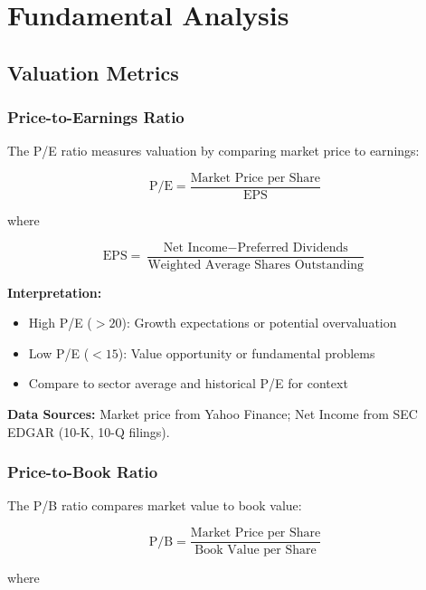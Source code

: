 \documentclass[11pt,a4paper]{article}
\begin{document}
\section{Fundamental Analysis}

\subsection{Valuation Metrics}

\subsubsection{Price-to-Earnings Ratio}

The P/E ratio measures valuation by comparing market price to earnings:

\begin{equation}
\text{P/E} = \frac{\text{Market Price per Share}}{\text{EPS}}
\end{equation}

where

\begin{equation}
\text{EPS} = \frac{\text{Net Income} - \text{Preferred Dividends}}{\text{Weighted Average Shares Outstanding}}
\end{equation}

\textbf{Interpretation:}
\begin{itemize}
    \item High P/E ($>20$): Growth expectations or potential overvaluation
    \item Low P/E ($<15$): Value opportunity or fundamental problems
    \item Compare to sector average and historical P/E for context
\end{itemize}

\textbf{Data Sources:} Market price from Yahoo Finance; Net Income from SEC EDGAR (10-K, 10-Q filings).

\subsubsection{Price-to-Book Ratio}

The P/B ratio compares market value to book value:

\begin{equation}
\text{P/B} = \frac{\text{Market Price per Share}}{\text{Book Value per Share}}
\end{equation}

where
\end{document}
